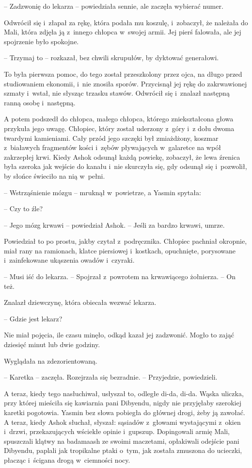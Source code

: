 \documentclass[oneside,polish,11pt,rmheadings]{mwbk}
\begin{document}
-- Zadzwonię do lekarza -- powiedziała sennie, ale zaczęła wybierać numer.

 Odwrócił się i~złapał za rękę, która podała mu koszulę, i~zobaczył, że należała do Mali, która zdjęła ją z~innego chłopca w~swojej armii. Jej pierś falowała, ale jej spojrzenie było spokojne.

-- Trzymaj to -- rozkazał, bez chwili skrupułów, by dyktować generałowi.

 To była pierwsza pomoc, do tego został przeszkolony przez ojca, na długo przed studiowaniem ekonomii, i~nie znosiła sporów. Przycisnął jej rękę do zakrwawionej szmaty i~wstał, nie słysząc trzasku stawów. Odwrócił się i~znalazł następną ranną osobę i~następną.

A potem podszedł do chłopca, małego chłopca, którego zniekształcona głowa przykuła jego uwagę. Chłopiec, który został uderzony z~góry i~z dołu dwoma twardymi kamieniami. Cały przód jego szczęki był zmiażdżony, koszmar z~białawych fragmentów kości i~zębów pływających w~galaretce na wpół zakrzepłej krwi. Kiedy Ashok odsunął każdą powiekę, zobaczył, że lewa źrenica była szeroka jak wejście do kanału i~nie skurczyła się, gdy odsunął się i~pozwolił, by słońce świeciło na nią w~pełni. 

-- Wstrząśnienie mózgu -- mruknął w~powietrze, a Yasmin spytała: 

-- Czy to źle?

-- Jego mózg krwawi -- powiedział Ashok. -- Jeśli za bardzo krwawi, umrze. 

 Powiedział to po prostu, jakby czytał z~podręcznika. Chłopiec pachniał okropnie, miał rany na ramionach, klatce piersiowej i~kostkach, opuchnięte, porysowane i~zainfekowane ukąszenia owadów i~czyraki. 
 
 -- Musi iść do lekarza. -- Spojrzał z~powrotem na krwawiącego żołnierza. -- On też. 

Znalazł dziewczynę, która obiecała wezwać lekarza.

 -- Gdzie jest lekarz? 
 
 Nie miał pojęcia, ile czasu minęło, odkąd kazał jej zadzwonić. Mogło to zająć dziesięć minut lub dwie godziny.

Wyglądała na zdezorientowaną. 

-- Karetka -- zaczęła. Rozejrzała się bezradnie. -- Przyjedzie, powiedzieli.

A teraz, kiedy tego nasłuchiwał, usłyszał to, odległe di-da, di-da. Wąska uliczka, przy której mieściła się kawiarnia pani Dibyendu, nigdy nie przyjęłaby szerokiej karetki pogotowia. Yasmin bez słowa pobiegła do głównej drogi, żeby ją zawołać. A teraz, kiedy Ashok słuchał, słyszał: sąsiadów z~głowami wystającymi z~okien i~drzwi, przekazujących wściekłe opinie i~gupszup. Dopingowali armię Mali, spuszczali klątwy na badamaash ze swoimi maczetami, opłakiwali odejście pani Dibyendu, paplali jak tropikalne ptaki o~tym, jak została zmuszona do ucieczki, płacząc i~ścigana drogą w~ciemności nocy.
\end{document}
